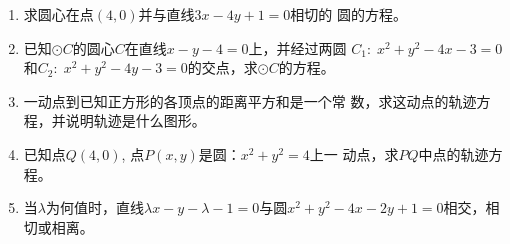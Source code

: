 \begin{enumerate}
\item 求圆心在点$(4,0)$并与直线$3x-4y+1=0$相切的
圆的方程。
\item 已知$\odot C$的圆心$C$在直线$x-y-4=0$上，并经过两圆
$C_1:\; x^2+y^2-4x-3=0$和$C_2:\; x^2+y^2-4y-3
=0$的交点，求$\odot C$的方程。
\item 一动点到已知正方形的各顶点的距离平方和是一个常
数，求这动点的轨迹方程，并说明轨迹是什么图形。
\item 已知点$Q(4,0)$, 点$P(x,y)$是圆：$x^2+y^2=4$上一
动点，求$PQ$中点的轨迹方程。
\item 当$\lambda$为何值时，直线$\lambda x-y-\lambda-1=0$与圆$x^2+y^2-
4x-2y+1=0$相交，相切或相离。
\end{enumerate}
